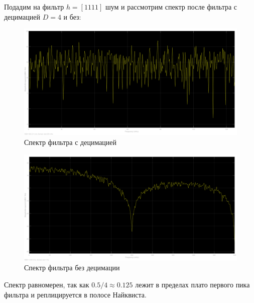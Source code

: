\documentclass[12pt,a4paper]{article}
\begin{document}
	Подадим на фильтр $h = [1 1 1 1]$ шум и рассмотрим спектр после фильтра с децимацией $D = 4$ и без:
	\begin{figure}[H]
		\centering
		\includegraphics[width=1.0\linewidth]{res/4_3_N4_dec.png}
		\caption{Спектр фильтра с децимацией}
	\end{figure}
	\begin{figure}[H]
		\centering
		\includegraphics[width=1.0\linewidth]{res/4_3_N4.png}
		\caption{Спектр фильтра без децимации}
	\end{figure}
	Спектр равномерен, так как $0.5 / 4 \approx 0.125$ лежит в пределах плато первого пика фильтра и реплицируется в полосе Найквиста.
	
\end{document}
